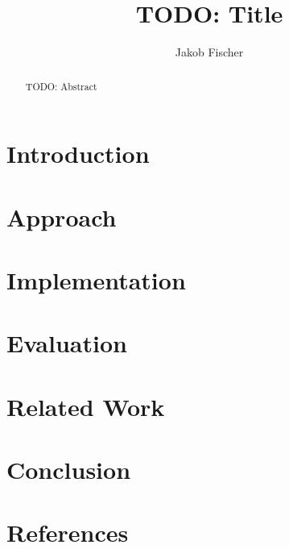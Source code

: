 \documentclass[12pt]{report}
\title{TODO: Title}
\author{Jakob Fischer}
\begin{document}
\maketitle

\begin{abstract}
TODO: Abstract
\end{abstract}

\chapter*{Introduction}

\chapter*{Approach}

\chapter*{Implementation}

\chapter*{Evaluation}

\chapter*{Related Work}

\chapter*{Conclusion}

\chapter*{References}


\end{document}

